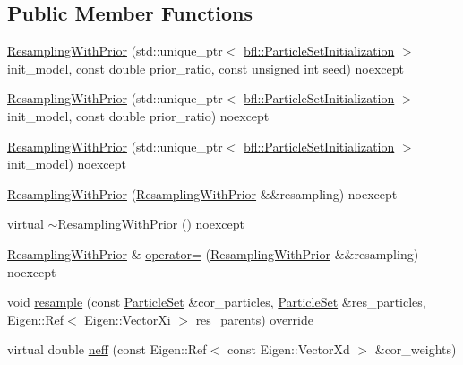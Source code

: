 \subsection*{Public Member Functions}
\begin{DoxyCompactItemize}
\item 
\mbox{\hyperlink{classbfl_1_1ResamplingWithPrior_a91d50339c774691e5ccf587dbbb71ecc}{Resampling\+With\+Prior}} (std\+::unique\+\_\+ptr$<$ \mbox{\hyperlink{classbfl_1_1ParticleSetInitialization}{bfl\+::\+Particle\+Set\+Initialization}} $>$ init\+\_\+model, const double prior\+\_\+ratio, const unsigned int seed) noexcept
\item 
\mbox{\hyperlink{classbfl_1_1ResamplingWithPrior_a8f6527d29c4c92c0ad213c4bd21b17da}{Resampling\+With\+Prior}} (std\+::unique\+\_\+ptr$<$ \mbox{\hyperlink{classbfl_1_1ParticleSetInitialization}{bfl\+::\+Particle\+Set\+Initialization}} $>$ init\+\_\+model, const double prior\+\_\+ratio) noexcept
\item 
\mbox{\hyperlink{classbfl_1_1ResamplingWithPrior_aefd4984732a28b95cc6460ae853e828a}{Resampling\+With\+Prior}} (std\+::unique\+\_\+ptr$<$ \mbox{\hyperlink{classbfl_1_1ParticleSetInitialization}{bfl\+::\+Particle\+Set\+Initialization}} $>$ init\+\_\+model) noexcept
\item 
\mbox{\hyperlink{classbfl_1_1ResamplingWithPrior_a8b813e6d3d80b914d06fdc60e46c3a53}{Resampling\+With\+Prior}} (\mbox{\hyperlink{classbfl_1_1ResamplingWithPrior}{Resampling\+With\+Prior}} \&\&resampling) noexcept
\item 
virtual \mbox{\hyperlink{classbfl_1_1ResamplingWithPrior_a686fa89037df955d6e657f2364644462}{$\sim$\+Resampling\+With\+Prior}} () noexcept
\item 
\mbox{\hyperlink{classbfl_1_1ResamplingWithPrior}{Resampling\+With\+Prior}} \& \mbox{\hyperlink{classbfl_1_1ResamplingWithPrior_a79ed56028dc2f97f0fb400a481998010}{operator=}} (\mbox{\hyperlink{classbfl_1_1ResamplingWithPrior}{Resampling\+With\+Prior}} \&\&resampling) noexcept
\item 
void \mbox{\hyperlink{classbfl_1_1ResamplingWithPrior_adc830de19fe1294ea404ced91f0b05d6}{resample}} (const \mbox{\hyperlink{classbfl_1_1ParticleSet}{Particle\+Set}} \&cor\+\_\+particles, \mbox{\hyperlink{classbfl_1_1ParticleSet}{Particle\+Set}} \&res\+\_\+particles, Eigen\+::\+Ref$<$ Eigen\+::\+Vector\+Xi $>$ res\+\_\+parents) override
\item 
virtual double \mbox{\hyperlink{classbfl_1_1Resampling_af1fbc21ffc2fb10f14b79210de57d614}{neff}} (const Eigen\+::\+Ref$<$ const Eigen\+::\+Vector\+Xd $>$ \&cor\+\_\+weights)
\end{DoxyCompactItemize}
